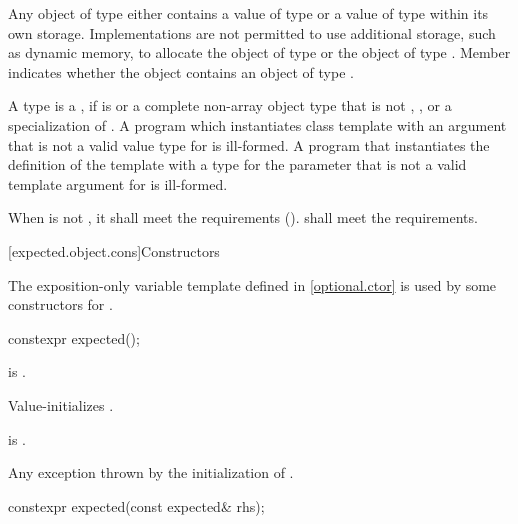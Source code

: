 \pnum
Any object of type  either
contains a value of type  or
a value of type  within its own storage.
Implementations are not permitted to use additional storage,
such as dynamic memory,
to allocate the object of type  or the object of type .
Member  indicates whether the  object
contains an object of type .

\pnum
A type  is a ,
if  is 
or a complete non-array object type that is not ,
,
or a specialization of .
A program which instantiates class template 
with an argument  that is not a valid value
type for  is ill-formed.
A program that instantiates
the definition of the template 
with a type for the  parameter
that is not a valid template argument for  is ill-formed.

\pnum
When  is not \cv{} , it shall meet
the  requirements ().
 shall meet
the  requirements.

[expected.object.cons]{Constructors}

\pnum
The exposition-only variable template 
defined in \ref{optional.ctor}
is used by some constructors for .

%
\begin{itemdecl}
constexpr expected();
\end{itemdecl}

\begin{itemdescr}
\pnum
\constraints
{} is .

\pnum
\effects
Value-initializes .

\pnum
\ensures
{} is .

\pnum
\throws
Any exception thrown by the initialization of .
\end{itemdescr}

%
\begin{itemdecl}
constexpr expected(const expected& rhs);
\end{itemdecl}

